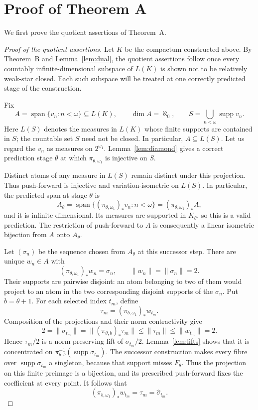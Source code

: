 \documentclass[a4paper,11pt]{amsart}
\theoremstyle{plain}
\theoremstyle{definition}
\theoremstyle{remark}
\newcommand{\supp}{\operatorname{supp}}
\newcommand{\Span}{\operatorname{span}}
\numberwithin{equation}{section}
\begin{document}
\section{Proof of Theorem A}\label{sec:finish}

We first prove the quotient assertions of Theorem~A.

\begin{proof}[Proof of the quotient assertions]
Let $K$ be the compactum constructed above.  By Theorem~B and Lemma~\ref{lem:dual}, the quotient assertions follow once every countably infinite-dimensional subspace of $L(K)$ is shown not to be relatively weak-star closed.  Each such subspace will be treated at one correctly predicted stage of the construction.

Fix
\[
 A=\Span\{v_n:n<\omega\}\subseteq L(K),
 \qquad\dim A=\aleph_0,
 \qquad S=\bigcup_{n<\omega}\supp v_n.
\]
Here $L(S)$ denotes the measures in $L(K)$ whose finite supports are contained in $S$; the countable set $S$ need not be closed.  In particular, $A\subseteq L(S)$.  Let us regard the $v_n$ as measures on $2^{\omega_1}$. Lemma~\ref{lem:diamond} gives a correct prediction stage $\theta$ at which $\pi_{\theta,\omega_1}$ is injective on $S$.

Distinct atoms of any measure in $L(S)$ remain distinct under this projection.  Thus push-forward is injective and variation-isometric on $L(S)$.  In particular, the predicted span at stage $\theta$ is
\[
 A_\theta=
 \Span\{(\pi_{\theta,\omega_1})_*v_n:n<\omega\}
 =(\pi_{\theta,\omega_1})_*A,
\]
and it is infinite dimensional.  Its measures are supported in $K_\theta$, so this is a valid prediction.  The restriction of push-forward to $A$ is consequently a linear isometric bijection from $A$ onto $A_\theta$.

Let $(\sigma_n)$ be the sequence chosen from $A_\theta$ at this successor step.  There are unique $w_n\in A$ with
\[
 (\pi_{\theta,\omega_1})_*w_n=\sigma_n,
 \qquad \|w_n\|=\|\sigma_n\|=2.
\]
Their supports are pairwise disjoint: an atom belonging to two of them would project to an atom in the two corresponding disjoint supports of the $\sigma_n$.  Put $b=\theta+1$.  For each selected index $t_m$, define
\[
 \tau_m=(\pi_{b,\omega_1})_*w_{t_m}.
\]
Composition of the projections and their norm contractivity give
\begin{equation}\label{eq:norm-preserving-hinge}
 2=\|\sigma_{t_m}\|
 =\|(\pi_{\theta,b})_*\tau_m\|
 \leqslant\|\tau_m\|
 \leqslant\|w_{t_m}\|=2.
\end{equation}
Hence $\tau_m/2$ is a norm-preserving lift of $\sigma_{t_m}/2$.  Lemma~\ref{lem:lifts} shows that it is concentrated on
$\pi_{\theta,b}^{-1}(\supp\sigma_{t_m})$.
The successor construction makes every fibre over $\supp\sigma_{t_m}$ a singleton, because that support misses $F_\theta$.  Thus the projection on this finite preimage is a bijection, and its prescribed push-forward fixes the coefficient at every point.  It follows that
\begin{equation}\label{eq:identified-lift}
 (\pi_{b,\omega_1})_*w_{t_m}
 =\tau_m=\widehat\sigma_{t_m}.
\end{equation}


\end{proof}
\end{document}
